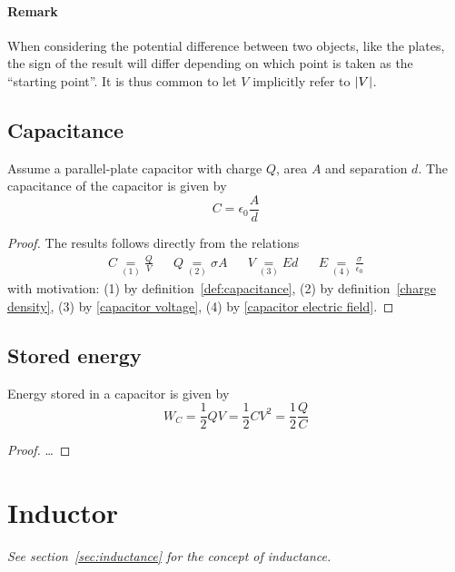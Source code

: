 \paragraph{Remark} When considering the potential difference between
two objects, like the plates, the sign of the result will differ
depending on which point is taken as the ``starting point''. It is
thus common to let $V$ implicitly refer to $\lvert V\rvert$.


\subsection{Capacitance}

Assume a parallel-plate capacitor with charge $Q$, area $A$ and
separation $d$. The capacitance of the capacitor is given by
\begin{equation*}
  C = \epsilon_0 \frac{A}{d}
\end{equation*}

\begin{proof}
  The results follows directly from the relations
  \begin{align*}
    C \underset{(1)}{=} \frac{Q}{V} && Q \underset{(2)}{=} \sigma A &&
    V \underset{(3)}{=} Ed && E \underset{(4)}{=} \frac{\sigma}{\epsilon_0}
  \end{align*}
  with motivation:
  (1) by definition~\ref{def:capacitance},
  (2) by definition~\ref{charge density},
  (3) by \ref{capacitor voltage},
  (4) by \ref{capacitor electric field}.
\end{proof}


\subsection{Stored energy}

Energy stored in a capacitor is given by
\begin{equation*}
  W_C = \frac{1}{2}QV = \frac{1}{2}CV^2 = \frac{1}{2}\frac{Q}{C}
\end{equation*}

\begin{proof}
  \ldots
\end{proof}


\section{Inductor}

\emph{See section~\ref{sec:inductance} for the concept of
  inductance.}
